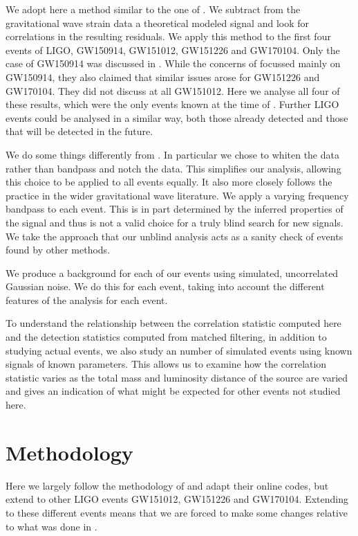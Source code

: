 \documentclass[a4paper,11pt]{article}
\begin{document}
We adopt here a method similar to the one of \cite{Nielsen:2018bhc}. We subtract from the gravitational wave strain data a theoretical modeled signal and look for correlations in the resulting residuals. We apply this method to the first four events of LIGO, GW150914, GW151012, GW151226 and GW170104. Only the case of GW150914 was discussed in \cite{Nielsen:2018bhc}. While the concerns of \cite{Creswell:2017rbh} focussed mainly on GW150914, they also claimed that similar issues arose for GW151226 and GW170104. They did not discuss at all GW151012. Here we analyse all four of these results, which were the only events known at the time of \cite{Creswell:2017rbh}. Further LIGO events could be analysed in a similar way, both those already detected and those that will be detected in the future.

We do some things differently from \cite{Nielsen:2018bhc}. In particular we chose to whiten the data rather than bandpass and notch the data. This simplifies our analysis, allowing this choice to be applied to all events equally. It also more closely follows the practice in the wider gravitational wave literature. We apply a varying frequency bandpass to each event. This is in part determined by the inferred properties of the signal and thus is not a valid choice for a truly blind search for new signals. We take the approach that our unblind analysis acts as a sanity check of events found by other methods.

We produce a background for each of our events using simulated, uncorrelated Gaussian noise. We do this for each event, taking into account the different features of the analysis for each event.

To understand the relationship between the correlation statistic computed here and the detection statistics computed from matched filtering, in addition to studying actual events, we also study an number of simulated events using known signals of known parameters. This allows us to examine how the correlation statistic varies as the total mass and luminosity distance of the source are varied and gives an indication of what might be expected for other events not studied here. 

\section{Methodology}

Here we largely follow the methodology of \cite{Nielsen:2018bhc} and adapt their online codes, but extend to other LIGO events GW151012, GW151226 and GW170104. Extending to these different events means that we are forced to make some changes relative to what was done in \cite{Nielsen:2018bhc}. 
\end{document}
